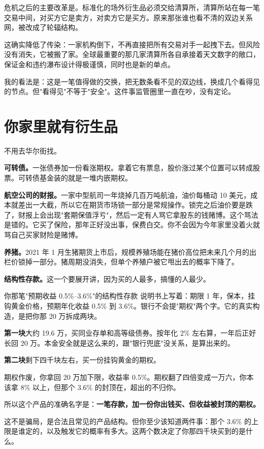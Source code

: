 危机之后的主要改革是。标准化的场外衍生品必须交给清算所，清算所站在每一笔交易中间，对买方它是卖方，对卖方它是买方。原来那张谁也看不清的双边关系网，被改成了轮辐结构。

这确实降低了传染：一家机构倒下，不再直接把所有交易对手一起拽下去。但风险没有消失，它被搬了家。全球最重要的那几家清算所各自承接着天文数字的敞口，保证金和违约瀑布设计得极谨慎，同时也是新的单点。

我的看法是：这是一笔值得做的交换，把无数条看不见的双边线，换成几个看得见的节点。但"看得见"不等于"安全"。这件事监管圈里一直在吵，没有定论。

\section{你家里就有衍生品}

不用去华尔街找。

\textbf{可转债。}一张债券加一份看涨期权。拿着它有票息，股价涨过某个位置可以转成股票。可转债基金装的就是一堆内嵌期权。

\textbf{航空公司的财报。}一家中型航司一年烧掉几百万吨航油，油价每桶动 10 美元，成本就差出一大截，所以它在期货市场锁一部分是常规操作。锁完之后油价要是跌了，财报上会出现"套期保值浮亏"，然后一定有人骂它拿股东的钱赌博。这个骂法是错的。它买了保险，那年正好没出事，保费白交。你不会因为今年家里没着火就骂自己买家财险是赌博。

\textbf{养猪。}2021 年 1 月生猪期货上市后，规模养殖场能在猪价高位把未来几个月的出栏价锁掉一部分。猪周期没消失，但单个养殖户被它甩出去的概率下降了。

\textbf{结构性存款。}这一个要展开讲，因为买的人最多，搞懂的人最少。

\begin{egbox}{你那笔"预期收益 0.5\%–3.6\%"的结构性存款}
说明书上写着：期限 1 年，保本，挂钩黄金价格，预期年化收益 0.5\% 到 3.6\%。银行不会提"期权"两个字。它的真实构造，是把你那 20 万拆成两块。

\textbf{第一块}大约 19.6 万，买同业存单和高等级债券。按年化 2\% 左右算，一年后正好长回 20 万。本金安全就是这么来的，跟"银行兜底"没关系，是算出来的。

\textbf{第二块}剩下四千块左右，买一份挂钩黄金的期权。

期权作废，你拿回 20 万加下限，收益率 0.5\%。期权翻了四倍变成一万六，你本该拿 8\% 以上，但那个 3.6\% 的封顶在，超出的不归你。

所以这个产品的准确名字是：\textbf{一笔存款，加一份你出钱买、但收益被封顶的期权。}

这不是骗局，是合法且常见的产品结构。但你至少该知道两件事：那个 3.6\% 的上限是谁定的，以及触发它的概率有多大。这两个数决定了你那四千块买到的是什么。

\end{egbox}

